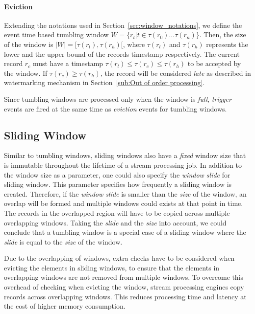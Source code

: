 \paragraph{Eviction}%
Extending the notations used in Section~\ref{sec:window_notations}, we define 
the event time based tumbling window $W = \{r_t |  t \in \tau(r_0) \dots \tau(r_n) \}$. 
Then, the size of the window is $|W| = [\tau(r_l), \tau(r_h)[$, where  
$\tau(r_l)$ and $\tau(r_h)$ represents the lower and the upper bound of the 
records timestamp respectively. 
The current record $r_c$ must have a timestamp  $\tau(r_l) \le \tau(r_c) \le \tau(r_h)$ 
to be accepted by the window. If $\tau(r_c) \ge \tau(r_h)$, the record will be 
considered \emph{late} as described in watermarking mechanism in Section~\ref{sub:Out of order processing}. 


Since tumbling windows are processed only when the window is \emph{full}, \emph{trigger} events 
are fired at the same time as \emph{eviction} events for tumbling windows.


\subsection{Sliding Window}%
\label{sec:Sliding Window}
Similar to tumbling windows, sliding windows also have a \emph{fixed} window size 
that is immutable throughout the lifetime of a stream processing job. 
In addition to the window size as a parameter, one could also specify the 
\emph{window slide} for sliding window. This parameter specifies how frequently 
a sliding window is created. 
Therefore, if the \emph{window slide} is smaller 
than the \emph{size} of the window, an overlap will be formed and multiple 
windows could exists at that point in time. The records in the overlapped region 
will have to be copied across multiple overlapping windows. 
Taking the \emph{slide} and the \emph{size} into account, we could conclude that 
a tumbling window is a special case of a sliding window where the \emph{slide} is 
equal to the \emph{size} of the window.

Due to the overlapping of windows, extra checks have to be considered 
when evicting the elements in sliding windows, to ensure that the elements in 
overlapping windows are not removed from multiple windows. To overcome this overhead 
of checking when evicting the window, 
stream processing engines copy records across overlapping windows. 
This reduces processing time and latency at the cost of higher memory consumption.

